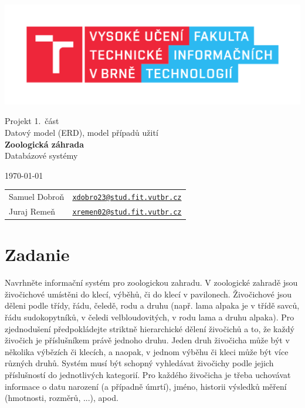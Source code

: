 \documentclass[11pt, a4paper]{article}
\begin{document}
	\begin{titlepage}
		\begin{center}
			\includegraphics[width=0.77 \linewidth]{FIT_logo.pdf} \\


			\Huge{Projekt 1.~část} \\
			\Huge{Datový model (ERD), model případů užití} \\
			\LARGE{\textbf{Zoologická záhrada}} \\
			\Large{Databázové systémy}

		\end{center}

		{\Large
			\today
			\hfill
			\begin{tabular}{ll}
			Samuel Dobroň & \href{mailto:xdobro23@stud.fit.vutbr.cz}{\texttt{xdobro23@stud.fit.vutbr.cz}} \\
            Juraj Remeň & \href{mailto:xremen02@stud.fit.vutbr.cz}{\texttt{xremen02@stud.fit.vutbr.cz}}
\end{tabular}
}
	\end{titlepage}
		\tableofcontents
		\vspace{21em}
		\section{Zadanie}
		Navrhněte informační systém pro zoologickou zahradu. V zoologické zahradě jsou živočichové umístěni do klecí, výběhů, či do klecí v pavilonech. Živočichové jsou děleni podle třídy, řádu, čeledě, rodu a druhu (např. lama alpaka je v třídě savců, řádu sudokopytníků, v čeledi velbloudovitých, v rodu lama a druhu alpaka). Pro zjednodušení předpokládejte striktně hierarchické dělení živočichů a to, že každý živočich je příslušníkem právě jednoho druhu. Jeden druh živočicha může být v několika výbězích či klecích, a naopak, v jednom výběhu či kleci může být více různých druhů. Systém musí být schopný vyhledávat živočichy podle jejich příslušností do jednotlivých kategorií. Pro každého živočicha je třeba uchovávat informace o datu narození (a případně úmrtí), jméno, historii výsledků měření (hmotnosti, rozměrů, ...), apod.
\end{document}
